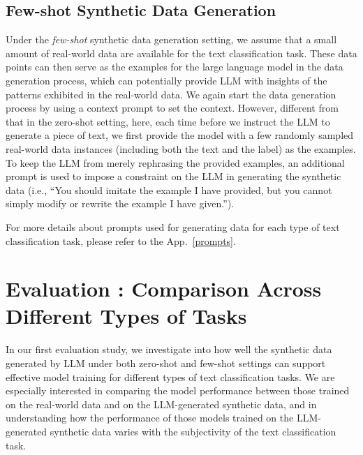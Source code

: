 \subsection{Few-shot Synthetic Data Generation}
\label{few-shot}
Under the {\em few-shot} synthetic data generation setting, we assume that a small amount of %
real-world data 
are available for the text classification task. These data points can then serve as the examples for the large language model in the data generation process, which can potentially provide LLM with insights of the patterns exhibited in the real-world data.  We again start the data generation process by using a context prompt to set the context. However, different from that in the zero-shot setting, here, each time before we instruct the LLM to generate a piece of text, we first provide the model with a few randomly sampled real-world data instances (including both the text and the label) as the examples. 
To keep the LLM from merely rephrasing the provided examples, an additional prompt is used to impose a constraint on the LLM in generating the synthetic data (i.e., ``You should imitate the example I have provided, but you cannot simply modify or rewrite the example I have given.''). 

For more details about prompts used for generating data for each type of text classification task, please refer to the App.~\ref{prompts}.
\section{Evaluation : Comparison Across Different Types of Tasks}
In our first evaluation study, we investigate into how well the synthetic data generated by LLM under both zero-shot and few-shot settings can support effective model training for different types of text classification tasks. 
We are especially interested in comparing the model performance between those trained on the real-world data and on the LLM-generated synthetic data, and in understanding how the performance of those models trained on the LLM-generated synthetic data varies with the subjectivity of the text classification task.
